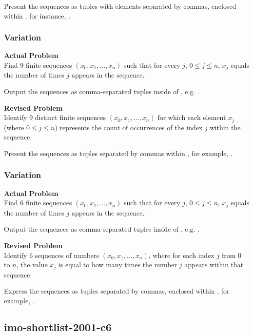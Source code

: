Present the sequences as tuples with elements separated by commas, enclosed within \boxed{}, for instance, .

\subsubsection{Variation}
\textbf{Actual Problem}\\
Find $9$ finite sequences $(x_0, x_1, \ldots, x_n)$ such that for every $j$, $0 \leq j \leq n$, $x_j$ equals the number of times $j$ appears in the sequence.

Output the sequences as comma-separated tuples inside of \boxed{}, e.g. .

\textbf{Revised Problem}\\
Identify $9$ distinct finite sequences $(x_0, x_1, \ldots, x_n)$ for which each element $x_j$ (where $0 \leq j \leq n$) represents the count of occurrences of the index $j$ within the sequence.

Present the sequences as tuples separated by commas within \boxed{}, for example, .

\subsubsection{Variation}
\textbf{Actual Problem}\\
Find $6$ finite sequences $(x_0, x_1, \ldots, x_n)$ such that for every $j$, $0 \leq j \leq n$, $x_j$ equals the number of times $j$ appears in the sequence.

Output the sequences as comma-separated tuples inside of \boxed{}, e.g. .

\textbf{Revised Problem}\\
Identify $6$ sequences of numbers $(x_0, x_1, \ldots, x_n)$, where for each index $j$ from $0$ to $n$, the value $x_j$ is equal to how many times the number $j$ appears within that sequence.

Express the sequences as tuples separated by commas, enclosed within \boxed{}, for example, .

\subsection{imo-shortlist-2001-c6}

